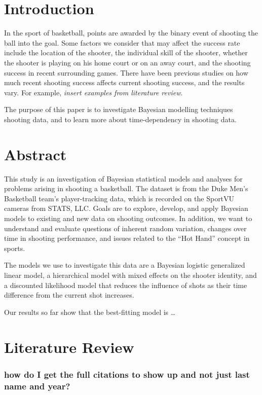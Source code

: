 \documentclass[12pt,twoside]{dukestatscithesis}
\theoremstyle{definition}
\theoremstyle{definition}
\theoremstyle{definition}
\theoremstyle{remark}
\begin{document}
\chapter*{Introduction}\label{introduction}

In the sport of basketball, points are awarded by the binary event of
shooting the ball into the goal. Some factors we consider that may
affect the success rate include the location of the shooter, the
individual skill of the shooter, whether the shooter is playing on his
home court or on an away court, and the shooting success in recent
surrounding games. There have been previous studies on how much recent
shooting success affects current shooting success, and the results vary.
For example, \emph{insert examples from literature review}.

The purpose of this paper is to investigate Bayesian modelling
techniques shooting data, and to learn more about time-dependency in
shooting data.

\chapter{Abstract}\label{abstract}

This study is an investigation of Bayesian statistical models and
analyses for problems arising in shooting a basketball. The dataset is
from the Duke Men's Basketball team's player-tracking data, which is
recorded on the SportVU cameras from STATS, LLC. Goals are to explore,
develop, and apply Bayesian models to existing and new data on shooting
outcomes. In addition, we want to understand and evaluate questions of
inherent random variation, changes over time in shooting performance,
and issues related to the ``Hot Hand'' concept in sports.

The models we use to investigate this data are a Bayesian logistic
generalized linear model, a hierarchical model with mixed effects on the
shooter identity, and a discounted likelihood model that reduces the
influence of shots as their time difference from the current shot
increases.

Our results so far show that the best-fitting model is \ldots{}

\chapter{Literature Review}\label{litreview}

\subsection{how do I get the full citations to show up and not just last
name and
year?}\label{how-do-i-get-the-full-citations-to-show-up-and-not-just-last-name-and-year}
\end{document}
